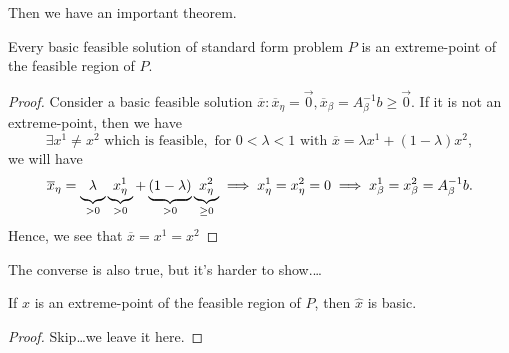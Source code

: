 Then we have an important theorem.
\begin{theorem}
	Every basic feasible solution of standard form problem \(P\) is an extreme-point of the feasible region of \(P\).
\end{theorem}
\begin{proof}
	Consider a basic feasible solution \(\overline{x}: \overline{x}_{\eta} = \vec{0}, \overline{x}_{\beta} = A^{-1}_{\beta}b\geq \vec{0}\).
	If it is not an extreme-point, then we have
	\[
		\exists x^1\neq x^2 \text{ which is feasible}, \text{ for }0<\lambda<1\text{ with }\overline{x} = \lambda x^1 + (1-\lambda)x^2,
	\]
	we will have
	\[
		\overline{x}_{\eta} = \underbrace{\vphantom{x^1_{\eta}}\lambda}_{>0}\underbrace{x^1_{\eta}}_{>0} + \underbrace{\vphantom{x^1_{\eta}}(1-\lambda)}_{>0}\underbrace{x^2_{\eta}}_{\geq 0} \implies x^1_{\eta} = x^2_{\eta} = 0 \implies x^1_{\beta} = x^2_{\beta} = A^{-1}_{\beta}b.
	\]
	Hence, we see that \(\overline{x} = x^1 = x^2\)\contd
\end{proof}

The converse is also true, but it's harder to show.\ldots
\begin{theorem}
	If \(\hat{x}\) is an extreme-point of the feasible region of \(P\), then \(\hat{x}\) is basic.
\end{theorem}
\begin{proof}
	Skip\ldots we leave it here.
\end{proof}

